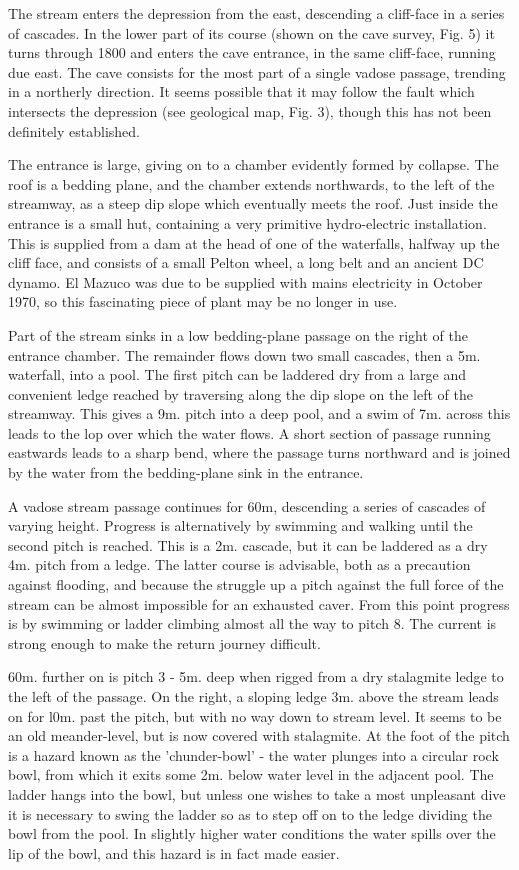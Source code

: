 \documentclass[11pt, a4paper, twoside]{memoir}
\begin{document}
The stream enters the depression from the east, descending a cliff-face in a series of cascades. In the lower part of its course (shown on the cave survey, Fig. 5) it turns through 1800 and enters the cave entrance, in the same cliff-face, running due east. The cave consists for the most part of a single vadose passage, trending in a northerly direction. It seems possible that it may follow the fault which intersects the depression (see geological map, Fig. 3), though this has not been definitely established.

The entrance is large, giving on to a chamber evidently formed by collapse. The roof is a bedding plane, and the chamber extends northwards, to the left of the streamway, as a steep dip slope which eventually meets the roof. Just inside the entrance is a small hut, containing a very primitive hydro-electric installation. This is supplied from a dam at the head of one of the waterfalls, halfway up the cliff face, and consists of a small Pelton wheel, a long belt and an ancient DC dynamo. El Mazuco was due to be supplied with mains electricity in October 1970, so this fascinating piece of plant may be no longer in use.

Part of the stream sinks in a low bedding-plane passage on the right of the entrance chamber. The remainder flows down two small cascades, then a 5m. waterfall, into a pool. The first pitch can be laddered dry from a large and convenient ledge reached by traversing along the dip slope on the left of the streamway. This gives a 9m. pitch into a deep pool, and a swim of 7m. across this leads to the lop over which the water flows. A short section of passage running eastwards leads to a sharp bend, where the passage turns northward and is joined by the water from the bedding-plane sink in the entrance.

A vadose stream passage continues for 60m, descending a series of cascades of varying height. Progress is alternatively by swimming and walking until the second pitch is reached. This is a 2m. cascade, but it can be laddered as a dry 4m. pitch from a ledge. The latter course is advisable, both as a precaution against flooding, and because the struggle up a pitch against the full force of the stream can be almost impossible for an exhausted caver. From this point progress is by swimming or ladder climbing almost all the way to pitch 8. The current is strong enough to make the return journey difficult.

60m. further on is pitch 3 - 5m. deep when rigged from a dry stalagmite ledge to the left of the passage. On the right, a sloping ledge 3m. above the stream leads on for l0m. past the pitch, but with no way down to stream level. It seems to be an old meander-level, but is now covered with stalagmite. At the foot of the pitch is a hazard known as the 'chunder-bowl' - the water plunges into a circular rock bowl, from which it exits some 2m. below water level in the adjacent pool. The ladder hangs into the bowl, but unless one wishes to take a most unpleasant dive it is necessary to swing the ladder so as to step off on to the ledge dividing the bowl from the pool. In slightly higher water conditions the water spills over the lip of the bowl, and this hazard is in fact made easier.
\end{document}
